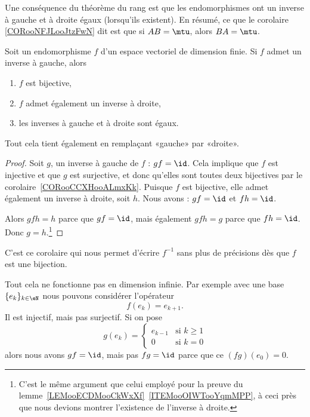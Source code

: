 Une conséquence du théorème du rang est que les endomorphismes ont un inverse à gauche et à droite égaux (lorsqu'ils existent). En résumé, ce que le corolaire \ref{CORooNFJLooJtzFwN} dit est que si \( AB=\mtu\), alors \( BA=\mtu\).
\begin{corollary}           \label{CORooNFJLooJtzFwN}
	Soit un endomorphisme \( f\) d'un espace vectoriel de dimension finie. Si \( f\) admet un inverse à gauche, alors
	\begin{enumerate}
		\item
		      \( f\) est bijective,
		\item
		      \( f\) admet également un inverse à droite,
		\item
		      les inverses à gauche et à droite sont égaux.
	\end{enumerate}
	Tout cela tient également en remplaçant «gauche» par «droite».
\end{corollary}

\begin{proof}
	Soit \( g\), un inverse à gauche de \( f\) : \( gf=\id\). Cela implique que \( f\) est injective et que \( g\) est surjective, et donc qu'elles sont toutes deux bijectives par le corolaire~\ref{CORooCCXHooALmxKk}. Puisque \( f\) est bijective, elle admet également un inverse à droite, soit \( h\). Nous avons : \( gf=\id\) et \( fh=\id\).

	Alors \( gfh=h\) parce que \( gf=\id\), mais également \( gfh=g\) parce que \( fh=\id\). Donc \( g=h\).\footnote{C'est le même argument que celui employé pour la preuve du lemme~\ref{LEMooECDMooCkWxXf}~\ref{ITEMooOIWTooYqmMPP}, à ceci près que nous devions montrer l'existence de l'inverse à droite.}
\end{proof}
C'est ce corolaire qui nous permet d'écrire \( f^{-1}\) sans plus de précisions dès que \( f\) est une bijection.

\begin{example}
	Tout cela ne fonctionne pas en dimension infinie. Par exemple avec une base \( \{ e_k \}_{k\in \eN}\) nous pouvons considérer l'opérateur
	\begin{equation}
		f(e_k)=e_{k+1}.
	\end{equation}
	Il est injectif, mais pas surjectif. Si on pose
	\begin{equation}
		g(e_k)=\begin{cases}
			e_{k-1} & \text{si } k\geq 1 \\
			0       & \text{si } k=0
		\end{cases}
	\end{equation}
	alors nous avons \( gf=\id\), mais pas \( fg=\id\) parce que ce \( (fg)(e_0)=0\).
\end{example}

